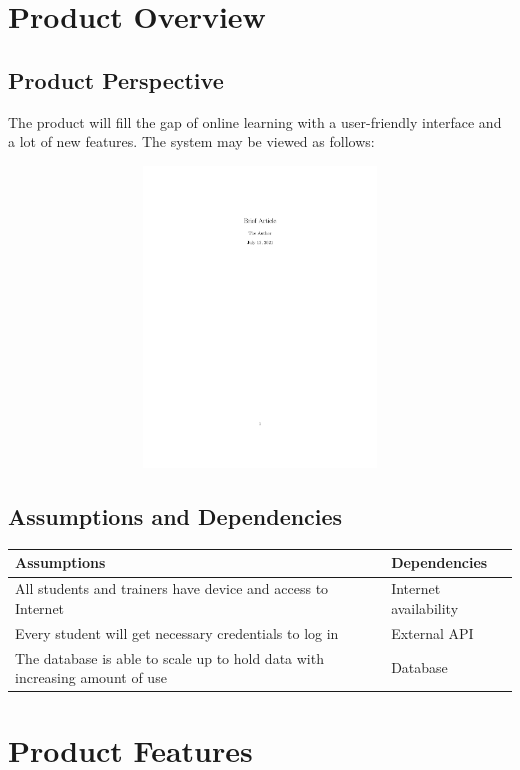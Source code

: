 \documentclass[a4paper]{article}
\begin{document}
\bigskip
\section{Product Overview}
\subsection{Product Perspective}
The product will fill the gap of online learning with a user-friendly interface and a lot of new features. The system may be viewed as follows: \\
\begin{figure}[h]
\includegraphics[width=12cm, height=8cm] {a1}
\centering
\end{figure}
\bigskip

\subsection{Assumptions and Dependencies}

\begin{table}[H]
\centering
\begin{tabular}{|p{5cm}|p{5cm}|}
\hline
\rowcolor{gray}
Assumptions & Dependencies\\ \hline
All students and trainers have device and access to Internet & Internet availability\\ \hline
Every student will get necessary credentials to log in & External API \\ \hline
The database is able to scale up to hold data with increasing amount of use & Database \\ 
\hline
\end{tabular}
\end{table}


\bigskip
\section{Product Features}
\end{document}
